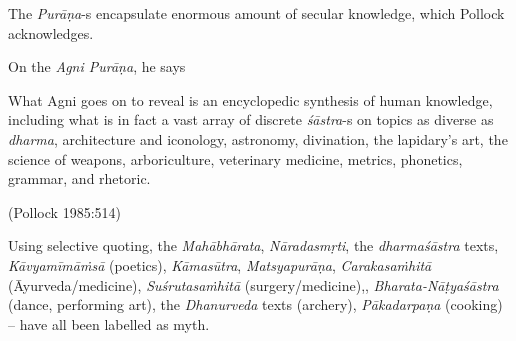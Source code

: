 The {\sl Purāṇa}-s encapsulate enormous amount of secular knowledge, which Pollock acknowledges.

On the {\sl Agni Purāṇa}, he says
\begin{myquote}
What Agni goes on to reveal is an encyclopedic synthesis of human knowledge, including what is in fact a vast array of discrete {\sl śāstra}-s on topics as diverse as {\sl dharma}, architecture and iconology, astronomy, divination, the lapidary's art, the science of weapons, arboriculture, veterinary medicine, metrics, phonetics, grammar, and rhetoric.

\hfill (Pollock 1985:514)
\end{myquote}

\newpage

Using  selective quoting, the {\sl Mahābhārata}, {\sl Nāradasmṛti},  the {\sl dharma}\-\break\hbox{\sl śāstra} texts, {\sl Kāvyamīmāṁsā} (poetics), {\sl Kāmasūtra},  {\sl Matsyapurāṇa},  {\sl Caraka\-saṁhitā} (Āyurveda/medicine),  {\sl Suśrutasaṁhitā} (surgery/\-medicine),, {\sl Bharata-Nāṭyaśāstra} (dance, performing art), the {\sl Dhanurveda} texts (archery), {\sl Pākadarpaṇa} (cooking) -- have all been labelled as myth.

